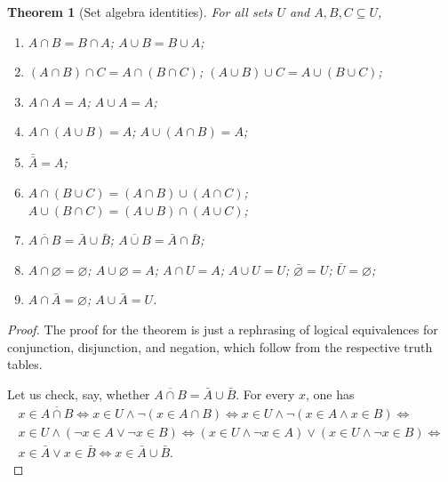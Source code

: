 \documentclass[12pt,notitlepage]{article}
\theoremstyle{plain}
\newtheorem{thm}{Theorem}[section]
\theoremstyle{definition}
\theoremstyle{plain}
\newcommand{\sbs}{\subseteq}
\newcommand{\void}{\varnothing}
\newcommand{\1}{\mathbf{1}}
\newcommand{\0}{\mathbf{0}}
\begin{document}
\begin{thm}[Set algebra identities]\label{ch0:boolean} For all sets $U$ and $A, B, C \sbs U$,
\begin{enumerate}
\item $A \cap B = B \cap A$; $A \cup B = B \cup A$;
\item $(A \cap B) \cap C = A \cap (B \cap C)$; $(A \cup B) \cup C = A \cup (B \cup C)$;
\item $A \cap A = A$; $A \cup A = A$;
\item $A \cap (A \cup B) = A$; $A \cup (A \cap B) = A$;
\item $\bar{\bar A} = A$;
\item $A \cap (B \cup C) = (A \cap B) \cup (A \cap C)$; $A \cup (B \cap C) = (A \cup B) \cap (A \cup C)$;
\item $\overline{A \cap B} = \bar A \cup \bar B$; $\overline{A \cup B} = \bar A \cap \bar B$;
\item $A \cap \void = \void$; $A \cup \void = A$; $A \cap U = A$; $A \cup U = U$; $\bar \void = U$; $\bar U = \void$;
\item $A \cap \bar A = \void$; $A \cup \bar A = U$.
\end{enumerate}
\end{thm}
\begin{proof}
The proof for the theorem is just a rephrasing of logical equivalences for conjunction, disjunction, and negation, which follow from the respective truth tables.

Let us check, say, whether $\overline{A \cap B} = \bar A \cup \bar B$. For every $x$, one has
\begin{multline*}
x \in \overline{A \cap B} \iff x \in U \wedge \neg (x \in A \cap B) \iff x \in U \wedge \neg (x \in A \wedge x \in B) \iff\\
	 x \in U \wedge (\neg x \in A \vee \neg x \in B) \iff (x \in U \wedge \neg x \in A) \vee (x \in U \wedge \neg x \in B) \iff\\
	  x \in \bar A \vee x \in \bar B \iff x \in \bar A \cup \bar B.
\end{multline*}

%
%
\end{proof}
\end{document}
